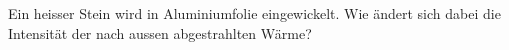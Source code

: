 Ein heisser Stein wird in Aluminiumfolie eingewickelt. Wie ändert sich dabei die Intensität der nach aussen abgestrahlten Wärme?
